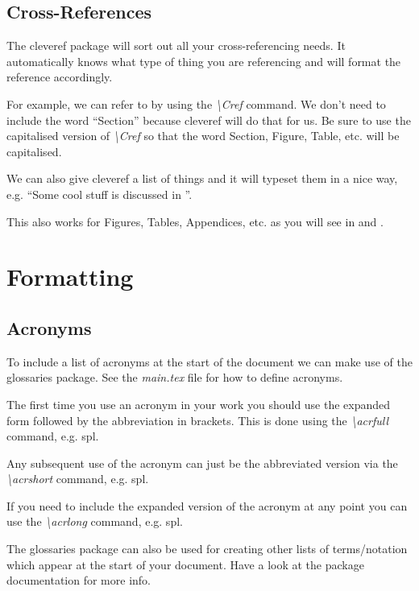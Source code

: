 \documentclass{BCUReport}
\begin{document}
\begin{appendices}
    \subsection{Cross-References}
    \label{sec:CrossReferences}
        The cleveref package will sort out all your cross-referencing needs. It automatically knows what type of thing you are referencing and will format the reference accordingly.
    
        For example, we can refer to  by using the \textit{\textbackslash Cref} command. We don't need to include the word ``Section'' because cleveref will do that for us. Be sure to use the capitalised version of \textit{\textbackslash Cref} so that the word Section, Figure, Table, etc. will be capitalised.
    
        We can also give cleveref a list of things and it will typeset them in a nice way, e.g. ``Some cool stuff is discussed in ''.
    
        This also works for Figures, Tables, Appendices, etc. as you will see in  and .
        
\section{Formatting}
\label{sec:Formatting}

    \subsection{Acronyms}
        To include a list of acronyms at the start of the document we can make use of the glossaries package. See the \textit{main.tex} file for how to define acronyms.
    
        The first time you use an acronym in your work you should use the expanded form followed by the abbreviation in brackets. This is done using the \textit{\textbackslash acrfull} command, e.g. \acrfull{spl}.
    
        Any subsequent use of the acronym can just be the abbreviated version via the \textit{\textbackslash acrshort} command, e.g. \acrshort{spl}.
    
        If you need to include the expanded version of the acronym at any point you can use the \textit{\textbackslash acrlong} command, e.g. \acrlong{spl}.
    
        The glossaries package can also be used for creating other lists of terms/notation which appear at the start of your document. Have a look at the package documentation for more info.


\end{appendices}
\end{document}
